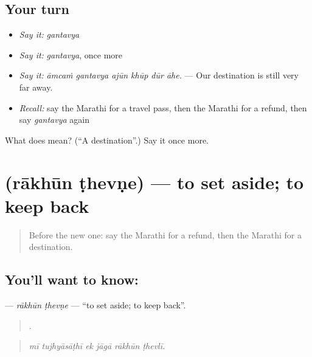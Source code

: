 \subsection*{Your turn}
\begin{itemize}
\raggedright
  \item \emph{Say it:} \emph{gantavya}
  \item \emph{Say it:} \emph{gantavya}, once more
  \item \emph{Say it:} \emph{āmcaṁ gantavya ajūn khūp dūr āhe.} — Our destination is still very far away.
  \item \emph{Recall:} say the Marathi for a travel pass, then the Marathi for a refund, then say \emph{gantavya} again
\end{itemize}

\begin{tcolorbox}[breakable,colback=teal!4,colframe=teal!35!black,title={Before you move on}]
What does  mean? (\textquotedblleft{}A destination\textquotedblright{}.) Say it once more.
\end{tcolorbox}
\section[\texorpdfstring{\mr{राखून} \mr{ठेवणे} (rākhūn ṭhevṇe)}{राखून ठेवणे (rākhūn ṭhevṇe)}]{  (rākhūn ṭhevṇe) — to set aside; to keep back}

\label{lesson:MR-C398-rakhun-thevne}



\begin{quote}
Before the new one: say the Marathi for a refund, then the Marathi for a destination.
\end{quote}

\subsection*{You'll want to know:  }
\textbf{ } — \emph{rākhūn ṭhevṇe} — \textquotedblleft{}to set aside; to keep back\textquotedblright{}.

\begin{quote}
     .
\end{quote}

\begin{quote}
\emph{mī tujhyāsāṭhī ek jāgā rākhūn ṭhevlī.}
\end{quote}

